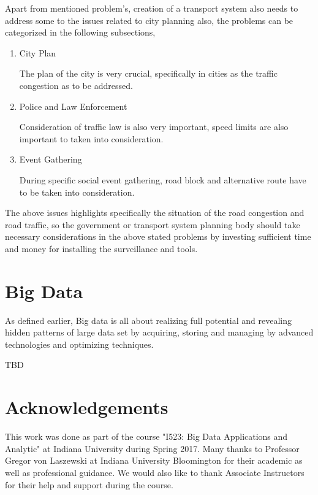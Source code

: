 \documentclass[sigconf]{acmart}
\begin{document}
Apart from mentioned problem's, creation of a transport system also needs to address some to the issues related to city planning also, the problems can be categorized in the following subsections,

\begin{enumerate}
\item City Plan 

The plan of the city is very crucial, specifically in cities as the traffic congestion as to be addressed. 

\item Police and Law Enforcement 

Consideration of traffic law is also very important, speed limits are also important to taken into consideration.

\item Event Gathering 

During specific social event gathering, road block and alternative route have to be taken into consideration.

\end{enumerate}

The above issues highlights specifically the situation of the road congestion and road traffic, so the government or transport system planning body should take necessary considerations in the above stated problems by investing sufficient time and money for installing the surveillance and tools. 


\section{Big Data}

As defined earlier, Big data is all about realizing full potential and revealing hidden patterns of large data set by acquiring, storing and managing by advanced technologies and optimizing techniques.


TBD \cite{wwwbigdata} 

\section*{Acknowledgements}

This work was done as part of the course "I523: Big Data Applications and Analytic" at Indiana University during Spring 2017. Many thanks to Professor Gregor von Laszewski at Indiana University Bloomington for their academic as well as professional guidance. We would also like to thank Associate Instructors for their help and support during the course. 



\end{document}
